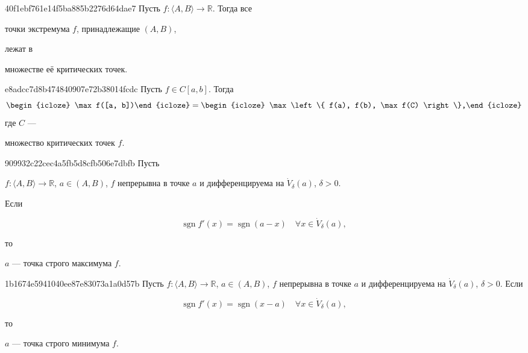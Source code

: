 \begin{note}{40f1ebf761e14f5ba885b2276d64dae7}
    Пусть \( f : \langle A, B \rangle \to \mathbb R  \). Тогда все
    \begin{icloze}{2}точки экстремума \( f \), принадлежащие \( (A, B) \),\end{icloze}
    лежат в \begin{icloze}{1}множестве её критических точек.\end{icloze}
\end{note}

\begin{note}{e8adcc7d8b474840907e72b38014fcdc}
    Пусть \( f \in C[a, b] \). Тогда
    \[
        \begin{icloze}{3}\max f([a, b])\end{icloze} = \begin{icloze}{1}\max \left\{ f(a), f(b), \max f(C) \right\},\end{icloze}
    \]
    где \( C \) --- \begin{icloze}{2}множество критических точек \( f \).\end{icloze}
\end{note}

\begin{note}{909932c22cec4a5fb5d8cfb506e7dbfb}
    Пусть \begin{icloze}{3}\( f : \langle A, B \rangle \to \mathbb R \), \( a \in (A, B)  \), \( f \) непрерывна в точке \( a \) и дифференцируема на \( \dot V_{\delta} (a) \), \( \delta > 0 \).\end{icloze}
    Если
    \begin{icloze}{1}\[
        \operatorname{sgn} f'(x) = \operatorname{sgn} (a - x) \quad \forall x \in \dot V_{\delta} (a),
    \]\end{icloze}
    то \begin{icloze}{2}\( a \) --- точка строго максимума \( f \).\end{icloze}
\end{note}

\begin{note}{1b1674e5941040ee87e83073a1a0d57b}
    Пусть \( f : \langle A, B \rangle \to \mathbb R \), \( a \in (A, B)  \), \( f \) непрерывна в точке \( a \) и дифференцируема на \( \dot V_{\delta} (a) \), \( \delta > 0 \).
    Если
    \begin{icloze}{1}\[
        \operatorname{sgn} f'(x) = \operatorname{sgn} (x - a) \quad \forall x \in \dot V_{\delta} (a),
    \]\end{icloze}
    то \begin{icloze}{2}\( a \) --- точка строго минимума \( f \).\end{icloze}
\end{note}

